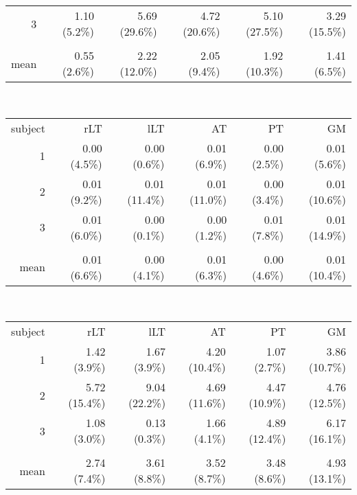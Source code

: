 \begin{table}
\begin{adjustbox}{width={0.9\textwidth},keepaspectratio}
\begin{minipage}{\linewidth}
{\begin{minipage}{\linewidth}
\begin{tabular}{rrrrrr}
		            3     & 1.10 (5.2\%) & 5.69 (29.6\%) & 4.72 (20.6\%) & 5.10 (27.5\%) & 3.29 (15.5\%) \\
		                  &       &       &       &       &  \\
		            mean  & 0.55 (2.6\%) & 2.22 (12.0\%) & 2.05 (9.4\%) & 1.92 (10.3\%) & 1.41 (6.5\%) \\
		            \bottomrule
		        \end{tabular}%
			\\[0.5ex]
		        \begin{tabular}{rrrrrr}
		            \addlinespace
				\multicolumn{6}{c}{\textbf{P0$_{z}$}}\\
		            \toprule
		            subject & rLT   & lLT   & AT    & PT    & GM \\
		            \midrule
		            1     & 0.00 (4.5\%) & 0.00 (0.6\%) & 0.01 (6.9\%) & 0.00 (2.5\%) & 0.01 (5.6\%) \\
		            2     & 0.01 (9.2\%) & 0.01 (11.4\%) & 0.01 (11.0\%) & 0.00 (3.4\%) & 0.01 (10.6\%) \\
		            3     & 0.01 (6.0\%) & 0.00 (0.1\%) & 0.00 (1.2\%) & 0.01 (7.8\%) & 0.01 (14.9\%) \\
		                  &       &       &       &       &  \\
		            mean  & 0.01 (6.6\%) & 0.00 (4.1\%) & 0.01 (6.3\%) & 0.00 (4.6\%) & 0.01 (10.4\%) \\
		            \bottomrule
		        \end{tabular}%
		        \\[0.5ex]
		        \begin{tabular}{rrrrrr}
		            \addlinespace
				\multicolumn{6}{c}{\textbf{FWHM$_{z}$}}\\		
		            \toprule
		            subject & rLT   & lLT   & AT    & PT    & GM \\
		            \midrule
		            1     & 1.42 (3.9\%) & 1.67 (3.9\%) & 4.20 (10.4\%) & 1.07 (2.7\%) & 3.86 (10.7\%) \\
		            2     & 5.72 (15.4\%) & 9.04 (22.2\%) & 4.69 (11.6\%) & 4.47 (10.9\%) & 4.76 (12.5\%) \\
		            3     & 1.08 (3.0\%) & 0.13 (0.3\%) & 1.66 (4.1\%) & 4.89 (12.4\%) & 6.17 (16.1\%) \\
		                  &       &       &       &       &  \\
		            mean  & 2.74 (7.4\%) & 3.61 (8.8\%) & 3.52 (8.7\%) & 3.48 (8.6\%) & 4.93 (13.1\%) \\
		            \bottomrule
		        \end{tabular}%
				\label{tab:chap5exp1 scan rescan qsi}
	    		\end{minipage}
		    }
\end{minipage}
\end{adjustbox}
\end{table}

